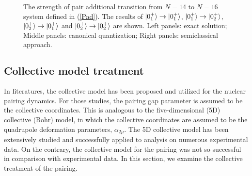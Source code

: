 \documentclass[%
superscriptaddress,
preprint,
showpacs,
nofootinbib,
amsmath,amssymb,
prc,
floatfix ]%
{revtex4-1}
\begin{document}
\begin{figure}[htbp]
 \begin{minipage}{0.33\hsize}
 \begin{center}
 \end{center}
 \captionsetup{labelformat=empty,labelsep=none}
 \end{minipage}
 \begin{minipage}{0.33\hsize}
 \begin{center}
 \end{center}
 \captionsetup{labelformat=empty,labelsep=none}
 \end{minipage}
 \begin{minipage}{0.33\hsize}
 \begin{center}
 \end{center}
 \captionsetup{labelformat=empty,labelsep=none}
 \end{minipage}
 \caption{The strength of pair additional transition from $N=14$ to $N=16$ system defined in (\ref{Pad}). The results of $\ket{0_1^+}\to\ket{0_1^+}$, $\ket{0_1^+}\to\ket{0_2^+}$, $\ket{0_2^+}\to\ket{0_1^+}$ and $\ket{0_2^+}\to\ket{0_2^+}$ are shown. Left panels: exact solution; Middle panels: canonical quantization; Right panels: semiclassical approach.}
 \label{fig:N16Pad}
\end{figure}




\subsection{Collective model treatment}

In literatures, the collective model has been proposed
and utilized for the nuclear pairing dynamics.
For those studies, the pairing gap parameter is assumed to be the
collective coordinates.
This is analogous to the five-dimensional (5D) collective (Bohr) model,
in which the collective coordinates are assumed to be the
quadrupole deformation parameters, $\alpha_{2\mu}$.
The 5D collective model has been extensively studied and
successfully applied to analysis on numerous experimental data.
On the contrary, the collective model for the pairing was not so
successful in comparison with experimental data.
In this section, we examine the collective treatment of the pairing.
\end{document}
